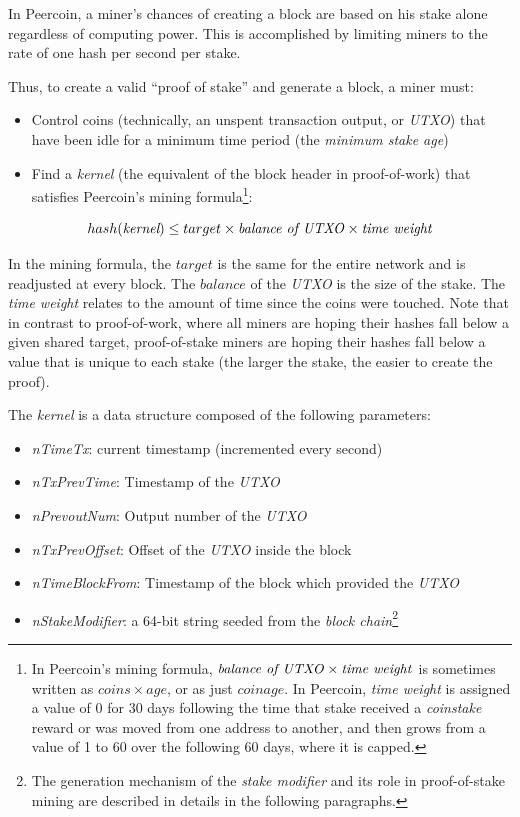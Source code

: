 \documentclass[a4paper,11pt]{article}
\begin{document}
In Peercoin, a miner's chances of creating a block are based on his stake alone regardless of computing power. This is accomplished by limiting miners to the rate of one hash per second per stake. 



Thus, to create a valid ``proof of stake'' and generate a block, a miner must:
\begin{itemize}
\item{Control coins (technically, an unspent transaction output, or \textit{UTXO}) that have been idle for a minimum time period (the \textit{minimum stake age})}
\item{Find a \textit{kernel} (the equivalent of the block header in proof-of-work) that satisfies Peercoin's mining formula\footnote{In Peercoin's mining formula, $\text{\textit{balance of \textit{UTXO}}} \times \text{\textit{time weight}}$ is sometimes written as $coins \times age$, or as just $coinage$. In Peercoin, \textit{time weight} is assigned a value of 0 for 30 days following the time that stake received a \textit{coinstake} reward or was moved from one address to another, and then grows from a value of 1 to 60 over the following 60 days, where it is capped.}:}
\end{itemize}

$$ hash(\textit{kernel})\leq target \times \text{\textit{balance of \textit{UTXO}}} \times \text{\textit{time weight}}$$

\vspace{5mm}
In the mining formula, the $target$ is the same for the entire network and is readjusted at every block. The $balance$ of the \textit{UTXO} is the size of the stake. The \textit{time weight} relates to the amount of time since the coins were touched. Note that in contrast to proof-of-work, where all miners are hoping their hashes fall below a given shared target, proof-of-stake miners are hoping their hashes fall below a value that is unique to each stake (the larger the stake, the easier to create the proof). 

The \textit{\textit{kernel}} is a data structure composed of the following parameters:
\begin{itemize}
\setlength{\itemsep}{0pt}
\item{\textit{nTimeTx}: current timestamp (incremented every second)}
\item{\textit{nTxPrevTime}: Timestamp of the \textit{UTXO}}
\item{\textit{nPrevoutNum}: Output number of the \textit{UTXO}}
\item{\textit{nTxPrevOffset}: Offset of the \textit{UTXO} inside the block}
\item{\textit{nTimeBlockFrom}: Timestamp of the block which provided the \textit{UTXO}}
\item{\textit{nStakeModifier}: a 64-bit string seeded from the \textit{block chain}\footnote{The generation mechanism of the \textit{stake modifier} and its role in proof-of-stake mining are described in details in the following paragraphs.}}
\end{itemize}
\end{document}
